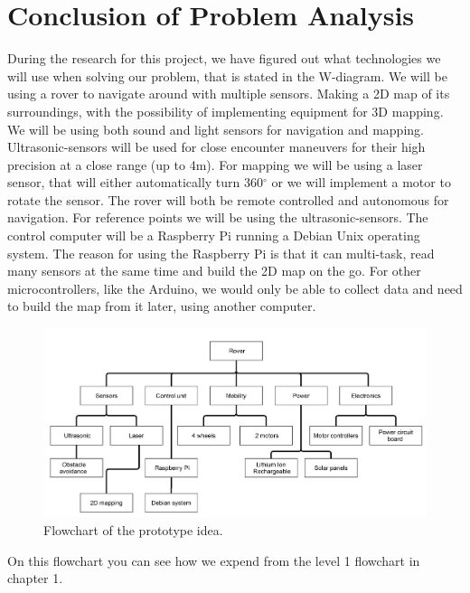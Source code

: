 \section{Conclusion of Problem Analysis}

During the research for this project, we have figured out what technologies we will use when solving our problem, that is stated in the W-diagram.
We will be using a rover to navigate around with multiple sensors. Making a 2D map of its surroundings, with the possibility of implementing equipment for 3D mapping. We will be using both sound and light sensors for navigation and mapping. Ultrasonic-sensors will be used for close encounter maneuvers for their high precision at a close range (up to 4m)\cite{ultra}. For mapping we will be using a laser sensor, that will either automatically turn 360$^{\circ}$  or we will implement a motor to rotate the sensor.
The rover will both be remote controlled and autonomous for navigation. For reference points we will be using the ultrasonic-sensors. The control computer will be a Raspberry Pi running a Debian Unix operating system. The reason for using the Raspberry Pi is that it can multi-task, read many sensors at the same time and build the 2D map on the go. For other microcontrollers, like the Arduino, we would only be able to collect data and need to build the map from it later, using another computer. 

\begin{figure}[H]
	\centering
	\includegraphics[scale=.1]{images/level2.png}
	\caption{Flowchart of the prototype idea.}
	\label{fig:level2}
\end{figure}

On this flowchart you can see how we expend from the level 1 flowchart in chapter 1.

